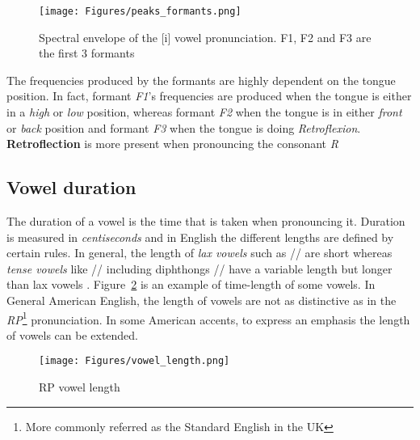 \begin{figure}[!ht]
    \centering
    \texttt{[image: Figures/peaks\_formants.png]}
    \caption{Spectral envelope of the [i] vowel pronunciation. F1, F2 and F3 are the first 3 formants \cite{formants_peaks}}
    \label{fig:peaks_formants}
\end{figure}

\noindent The frequencies produced by the formants are highly dependent on the tongue position. In fact, formant \textit{F1}'s frequencies are produced when the tongue is either in a \textit{high} or \textit{low} position, whereas formant \textit{F2} when the tongue is in either \textit{front} or \textit{back} position and formant \textit{F3} when the tongue is doing \textit{Retroflexion}. \textbf{Retroflection} is more present when pronouncing the consonant \textit{R}


\subsection{Vowel duration}
\label{sub:vowel_duration}
The duration of a vowel is the time that is taken when pronouncing it. Duration is measured in \textit{centiseconds} and in English the different lengths are defined by certain rules. In general, the length of \textit{lax vowels} such as // are short whereas \textit{tense vowels} like // including diphthongs // have a variable length but longer than lax vowels \cite{vowel_length}. Figure~\ref{fig:vowel_length} is an example of time-length of some vowels.
\noindent In General American English, the length of vowels are not as distinctive as in the \textit{RP}\footnote{More commonly referred as the Standard English in the UK} pronunciation. In some American accents, to express an emphasis the length of vowels can be extended.

\begin{figure}[!ht]
    \centering
    \texttt{[image: Figures/vowel\_length.png]}
    \caption{RP vowel length \cite{vowel_length}}
    \label{fig:vowel_length}
\end{figure}


